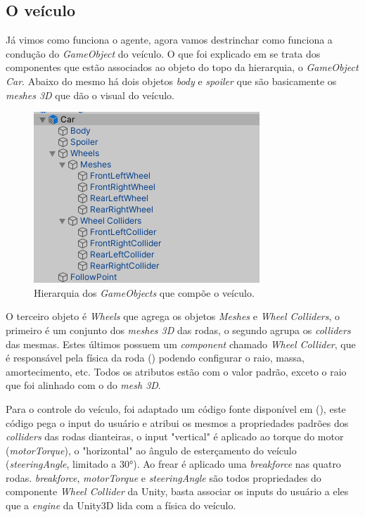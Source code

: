 \subsection{O veículo}
Já vimos como funciona o agente, agora vamos destrinchar como funciona a condução do \textit{GameObject} do veículo. O que foi explicado em  se trata dos componentes que estão associados ao objeto do topo da hierarquia, o \textit{GameObject Car}. Abaixo do mesmo há dois objetos \textit{body} e \textit{spoiler} que são basicamente os \textit{meshes 3D} que dão o visual do veículo.

\begin{figure}[h]
   \centering
   \includegraphics{figs/hierarquia-veiculo.png}
    \caption{Hierarquia dos \textit{GameObjects} que compõe o veículo.}
    \label{fig:vehicle-hierarchy}
\end{figure}

O terceiro objeto é \textit{Wheels} que agrega os objetos \textit{Meshes} e \textit{Wheel Colliders}, o primeiro é um conjunto dos \textit{meshes 3D} das rodas, o segundo agrupa os \textit{colliders} das mesmas. Estes últimos possuem um \textit{component} chamado \textit{Wheel Collider}, que é responsável pela física da roda () podendo configurar o raio, massa, amortecimento, etc. Todos os atributos estão com o valor padrão, exceto o raio que foi alinhado com o do \textit{mesh 3D}.

Para o controle do veículo, foi adaptado um código fonte disponível em (), este código pega o input do usuário e atribui os mesmos a propriedades padrões dos \textit{colliders} das rodas dianteiras, o input "vertical"{} é aplicado ao torque do motor (\textit{motorTorque}), o "horizontal" ao ângulo de esterçamento do veículo (\textit{steeringAngle}, limitado a 30°). Ao frear é aplicado uma \textit{breakforce} nas quatro rodas. \textit{breakforce}, \textit{motorTorque} e \textit{steeringAngle} são todos propriedades do componente \textit{Wheel Collider} da Unity, basta associar os inputs do usuário a eles que a \textit{engine} da Unity3D lida com a física do veículo.

